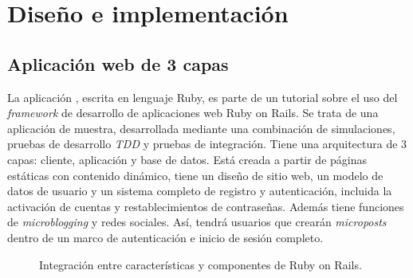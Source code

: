 \chapter{Diseño e implementación}
\label{cha:regulation}

\section{Aplicación web de 3 capas}

La aplicación , escrita en lenguaje Ruby, es parte de un tutorial sobre el uso del \textit{framework} de desarrollo de aplicaciones web Ruby on Rails. Se trata de una aplicación de muestra, desarrollada mediante una combinación de simulaciones, pruebas de desarrollo \textit{TDD} y pruebas de integración. Tiene una arquitectura de 3 capas: cliente, aplicación y base de datos. Está creada a partir de páginas estáticas con contenido dinámico, tiene un diseño de sitio web, un modelo de datos de usuario y un sistema completo de registro y autenticación, incluida la activación de cuentas y restablecimientos de contraseñas. Además tiene funciones de \textit{microblogging} y redes sociales. Así, tendrá usuarios que crearán \textit{microposts} dentro de un marco de autenticación e inicio de sesión completo.

\begin{figure}[H]
\caption{Integración entre características y componentes de Ruby on Rails.\label{fig:figure_placement_example}}
\end{figure}

